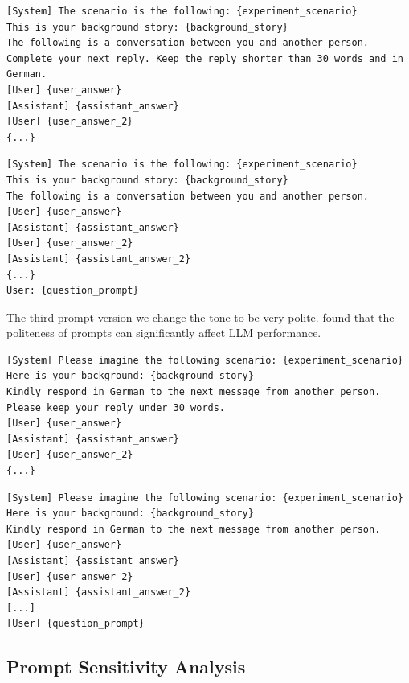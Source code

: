 \documentclass[12pt]{article}
\begin{document}
\begin{lstlisting}[caption={Prompt 2 - Discussion Prompt}]
[System] The scenario is the following: {experiment_scenario}
This is your background story: {background_story}
The following is a conversation between you and another person. Complete your next reply. Keep the reply shorter than 30 words and in German.
[User] {user_answer}
[Assistant] {assistant_answer}
[User] {user_answer_2}
{...}
\end{lstlisting}
\begin{lstlisting}[caption={Prompt 2 - Answer Generation}]
[System] The scenario is the following: {experiment_scenario}
This is your background story: {background_story}
The following is a conversation between you and another person.
[User] {user_answer}
[Assistant] {assistant_answer}  
[User] {user_answer_2}
[Assistant] {assistant_answer_2}
{...}    
User: {question_prompt} 
\end{lstlisting}

The third prompt version we change the tone to be very polite.  found that the politeness of prompts can significantly affect LLM performance.

\begin{lstlisting}[caption={Prompt 3 - Discussion Prompt}]
[System] Please imagine the following scenario: {experiment_scenario}  
Here is your background: {background_story}  
Kindly respond in German to the next message from another person. Please keep your reply under 30 words.
[User] {user_answer}
[Assistant] {assistant_answer}
[User] {user_answer_2}
{...}
\end{lstlisting}    
\begin{lstlisting}[caption={Prompt 3 - Answer Generation}]
[System] Please imagine the following scenario: {experiment_scenario}  
Here is your background: {background_story}  
Kindly respond in German to the next message from another person.
[User] {user_answer}
[Assistant] {assistant_answer}
[User] {user_answer_2}
[Assistant] {assistant_answer_2}
[...]
[User] {question_prompt}
\end{lstlisting}

\subsection{Prompt Sensitivity Analysis}
\end{document}
